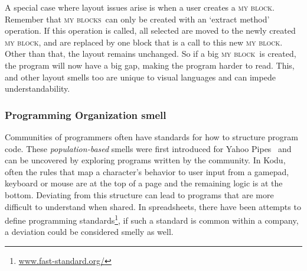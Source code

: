 \documentclass[conference]{IEEEtran}
\newcommand{\mbs}{\textsc{my blocks}}
\newcommand{\mb}{\textsc{my block}}
\newcommand{\todo}[1]{\textbf{#1}}
\begin{document}
A special case where layout issues arise is when a user creates a \mb. Remember that \mbs~can only be created with an `extract method' operation. If this operation is called, all selected are moved to the newly created \mb, and are replaced by one block that is a call to this new \mb. Other than that, the layout remains unchanged. So if a big \mb~is created, the program will now have a big gap, making the program harder to read. This, and other layout smells too are unique to visual languages and can impede understandability. 

%
%	



\subsubsection{Programming Organization smell}
Communities of programmers often have standards for how to structure program code. These \emph{population-based} smells were first introduced for Yahoo Pipes~\cite{StoleeTSE2013} and can be uncovered by exploring programs written by the community. In Kodu, often the rules that map a character's behavior to user input from a gamepad, keyboard or mouse are at the top of a page and the remaining logic is at the bottom. Deviating from this structure can lead to programs that are more difficult to understand when shared. In spreadsheets, there have been attempts to define programming standards\footnote{\url{www.fast-standard.org/}}, if such a standard is common within a company, a deviation could be considered smelly as well.
\end{document}
